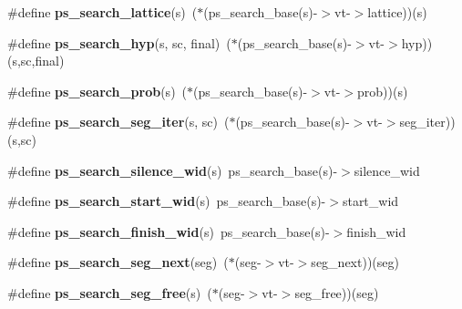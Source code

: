\begin{DoxyCompactItemize}
\item 
\#define {\bfseries ps\+\_\+search\+\_\+lattice}(s)~($\ast$(ps\+\_\+search\+\_\+base(s)-\/$>$vt-\/$>$lattice))(s)\label{pocketsphinx__internal_8h_ac821fb65e0c2ef778a4b8b49ecf30e11}

\item 
\#define {\bfseries ps\+\_\+search\+\_\+hyp}(s,  sc,  final)~($\ast$(ps\+\_\+search\+\_\+base(s)-\/$>$vt-\/$>$hyp))(s,sc,final)\label{pocketsphinx__internal_8h_a61247136ccf60cf65c19ecc9efebcb73}

\item 
\#define {\bfseries ps\+\_\+search\+\_\+prob}(s)~($\ast$(ps\+\_\+search\+\_\+base(s)-\/$>$vt-\/$>$prob))(s)\label{pocketsphinx__internal_8h_a3fb9e1a2036effd2f15cd088140c750f}

\item 
\#define {\bfseries ps\+\_\+search\+\_\+seg\+\_\+iter}(s,  sc)~($\ast$(ps\+\_\+search\+\_\+base(s)-\/$>$vt-\/$>$seg\+\_\+iter))(s,sc)\label{pocketsphinx__internal_8h_a6478039ec1ab5948ff19123c4464a5a4}

\item 
\#define {\bfseries ps\+\_\+search\+\_\+silence\+\_\+wid}(s)~ps\+\_\+search\+\_\+base(s)-\/$>$silence\+\_\+wid\label{pocketsphinx__internal_8h_aab989bd93fe7abcc165bc92d6ccc1bac}

\item 
\#define {\bfseries ps\+\_\+search\+\_\+start\+\_\+wid}(s)~ps\+\_\+search\+\_\+base(s)-\/$>$start\+\_\+wid\label{pocketsphinx__internal_8h_a6dc7da2c1bc3bfb15d5fbe3618a4e3d4}

\item 
\#define {\bfseries ps\+\_\+search\+\_\+finish\+\_\+wid}(s)~ps\+\_\+search\+\_\+base(s)-\/$>$finish\+\_\+wid\label{pocketsphinx__internal_8h_aaeee657147579bc652c494989622f6b4}

\item 
\#define {\bfseries ps\+\_\+search\+\_\+seg\+\_\+next}(seg)~($\ast$(seg-\/$>$vt-\/$>$seg\+\_\+next))(seg)\label{pocketsphinx__internal_8h_ae7c150fad9fc9e8a13e632a1386b8f56}

\item 
\#define {\bfseries ps\+\_\+search\+\_\+seg\+\_\+free}(s)~($\ast$(seg-\/$>$vt-\/$>$seg\+\_\+free))(seg)\label{pocketsphinx__internal_8h_a38f6b225e3eace3793cdae8135b0aaab}

\end{DoxyCompactItemize}
